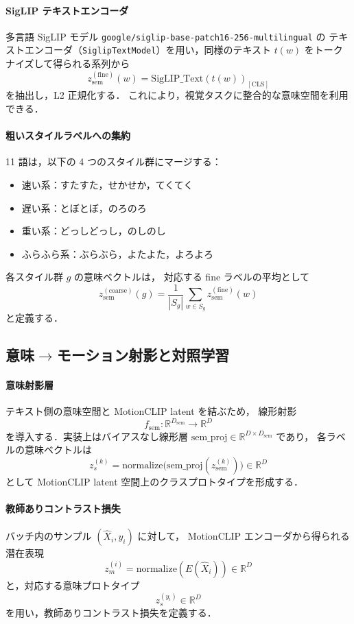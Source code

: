 \documentclass[a4paper,10pt]{jsarticle}
\begin{document}
\paragraph{SigLIP テキストエンコーダ}
多言語 SigLIP モデル \texttt{google/siglip-base-patch16-256-multilingual} の
テキストエンコーダ（\texttt{SiglipTextModel}）を用い，同様のテキスト
$t(w)$ をトークナイズして得られる系列から
\[
z_{\mathrm{sem}}^{(\mathrm{fine})}(w)
= \mathrm{SigLIP\_Text}(t(w))_{[\mathrm{CLS}]}
\]
を抽出し，L2 正規化する．
これにより，視覚タスクに整合的な意味空間を利用できる．

\paragraph{粗いスタイルラベルへの集約}
11 語は，以下の 4 つのスタイル群にマージする：
\begin{itemize}
  \item 速い系：すたすた，せかせか，てくてく
  \item 遅い系：とぼとぼ，のろのろ
  \item 重い系：どっしどっし，のしのし
  \item ふらふら系：ぶらぶら，よたよた，よろよろ
\end{itemize}
各スタイル群 $g$ の意味ベクトルは，
対応する fine ラベルの平均として
\[
z_{\mathrm{sem}}^{(\mathrm{coarse})}(g)
= \frac{1}{|S_g|} \sum_{w \in S_g}
z_{\mathrm{sem}}^{(\mathrm{fine})}(w)
\]
と定義する．

\subsection{意味$\to$モーション射影と対照学習}

\paragraph{意味射影層}
テキスト側の意味空間と MotionCLIP latent を結ぶため，
線形射影
\[
f_{\mathrm{sem}}: \mathbb{R}^{D_{\mathrm{sem}}} \to \mathbb{R}^{D}
\]
を導入する．実装上はバイアスなし線形層
$\mathrm{sem\_proj} \in \mathbb{R}^{D \times D_{\mathrm{sem}}}$ であり，
各ラベルの意味ベクトルは
\[
z_s^{(k)} = \mathrm{normalize}
\bigl(
 \mathrm{sem\_proj}(z_{\mathrm{sem}}^{(k)})
\bigr)
\in \mathbb{R}^{D}
\]
として MotionCLIP latent 空間上のクラスプロトタイプを形成する．

\paragraph{教師ありコントラスト損失}
バッチ内のサンプル $(\hat{X}_i, y_i)$ に対して，
MotionCLIP エンコーダから得られる潜在表現
\[
z_m^{(i)} = \mathrm{normalize}(E(\hat{X}_i)) \in \mathbb{R}^{D}
\]
と，対応する意味プロトタイプ
\[
z_s^{(y_i)} \in \mathbb{R}^{D}
\]
を用い，教師ありコントラスト損失を定義する．
\end{document}
